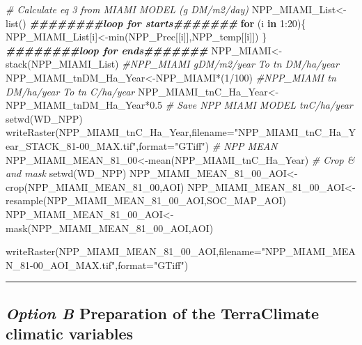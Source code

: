 \documentclass[
  10pt,
  b5paper,
]{book}
\newenvironment{Shaded}{\begin{snugshade}}{\end{snugshade}}
\newcommand{\AttributeTok}[1]{\textcolor[rgb]{0.77,0.63,0.00}{#1}}
\newcommand{\CommentTok}[1]{\textcolor[rgb]{0.56,0.35,0.01}{\textit{#1}}}
\newcommand{\ControlFlowTok}[1]{\textcolor[rgb]{0.13,0.29,0.53}{\textbf{#1}}}
\newcommand{\DecValTok}[1]{\textcolor[rgb]{0.00,0.00,0.81}{#1}}
\newcommand{\DocumentationTok}[1]{\textcolor[rgb]{0.56,0.35,0.01}{\textbf{\textit{#1}}}}
\newcommand{\FloatTok}[1]{\textcolor[rgb]{0.00,0.00,0.81}{#1}}
\newcommand{\FunctionTok}[1]{\textcolor[rgb]{0.00,0.00,0.00}{#1}}
\newcommand{\NormalTok}[1]{#1}
\newcommand{\OtherTok}[1]{\textcolor[rgb]{0.56,0.35,0.01}{#1}}
\newcommand{\SpecialCharTok}[1]{\textcolor[rgb]{0.00,0.00,0.00}{#1}}
\newcommand{\StringTok}[1]{\textcolor[rgb]{0.31,0.60,0.02}{#1}}
\begin{document}
\begin{Shaded}
\begin{Highlighting}[]
\CommentTok{\# Calculate eq 3 from MIAMI MODEL (g DM/m2/day)}
\NormalTok{NPP\_MIAMI\_List}\OtherTok{\textless{}{-}}\FunctionTok{list}\NormalTok{()}
\DocumentationTok{\#\#\#\#\#\#\#\#loop for starts\#\#\#\#\#\#\#}
\ControlFlowTok{for}\NormalTok{ (i }\ControlFlowTok{in} \DecValTok{1}\SpecialCharTok{:}\DecValTok{20}\NormalTok{)\{}
\NormalTok{NPP\_MIAMI\_List[i]}\OtherTok{\textless{}{-}}\FunctionTok{min}\NormalTok{(NPP\_Prec[[i]],NPP\_temp[[i]])}
\NormalTok{\}}
\DocumentationTok{\#\#\#\#\#\#\#\#loop for ends\#\#\#\#\#\#\#}
\NormalTok{NPP\_MIAMI}\OtherTok{\textless{}{-}}\FunctionTok{stack}\NormalTok{(NPP\_MIAMI\_List)}
\CommentTok{\#NPP\_MIAMI gDM/m2/year To tn DM/ha/year}
\NormalTok{NPP\_MIAMI\_tnDM\_Ha\_Year}\OtherTok{\textless{}{-}}\NormalTok{NPP\_MIAMI}\SpecialCharTok{*}\NormalTok{(}\DecValTok{1}\SpecialCharTok{/}\DecValTok{100}\NormalTok{)}
\CommentTok{\#NPP\_MIAMI tn DM/ha/year To tn C/ha/year}
\NormalTok{NPP\_MIAMI\_tnC\_Ha\_Year}\OtherTok{\textless{}{-}}\NormalTok{NPP\_MIAMI\_tnDM\_Ha\_Year}\SpecialCharTok{*}\FloatTok{0.5}
\CommentTok{\# Save NPP MIAMI MODEL tnC/ha/year}
\FunctionTok{setwd}\NormalTok{(WD\_NPP)}
\FunctionTok{writeRaster}\NormalTok{(NPP\_MIAMI\_tnC\_Ha\_Year,}\AttributeTok{filename=}\StringTok{"NPP\_MIAMI\_tnC\_Ha\_Year\_STACK\_81{-}00\_MAX.tif"}\NormalTok{,}\AttributeTok{format=}\StringTok{"GTiff"}\NormalTok{)}
\CommentTok{\# NPP MEAN}
\NormalTok{NPP\_MIAMI\_MEAN\_81\_00}\OtherTok{\textless{}{-}}\FunctionTok{mean}\NormalTok{(NPP\_MIAMI\_tnC\_Ha\_Year)}
\CommentTok{\# Crop \& and mask}
\FunctionTok{setwd}\NormalTok{(WD\_NPP)}
\NormalTok{NPP\_MIAMI\_MEAN\_81\_00\_AOI}\OtherTok{\textless{}{-}}\FunctionTok{crop}\NormalTok{(NPP\_MIAMI\_MEAN\_81\_00,AOI)}
\NormalTok{NPP\_MIAMI\_MEAN\_81\_00\_AOI}\OtherTok{\textless{}{-}}\FunctionTok{resample}\NormalTok{(NPP\_MIAMI\_MEAN\_81\_00\_AOI,SOC\_MAP\_AOI)}
\NormalTok{NPP\_MIAMI\_MEAN\_81\_00\_AOI}\OtherTok{\textless{}{-}}\FunctionTok{mask}\NormalTok{(NPP\_MIAMI\_MEAN\_81\_00\_AOI,AOI)}

\FunctionTok{writeRaster}\NormalTok{(NPP\_MIAMI\_MEAN\_81\_00\_AOI,}\AttributeTok{filename=}\StringTok{"NPP\_MIAMI\_MEAN\_81{-}00\_AOI\_MAX.tif"}\NormalTok{,}\AttributeTok{format=}\StringTok{"GTiff"}\NormalTok{)}
\end{Highlighting}
\end{Shaded}

\begin{center}\rule{0.5\linewidth}{0.5pt}\end{center}

\hypertarget{option-b-preparation-of-the-terraclimate-climatic-variables}{%
\subsection{\texorpdfstring{\emph{Option B} Preparation of the TerraClimate climatic variables}{Option B Preparation of the TerraClimate climatic variables}}\label{option-b-preparation-of-the-terraclimate-climatic-variables}}
\end{document}

